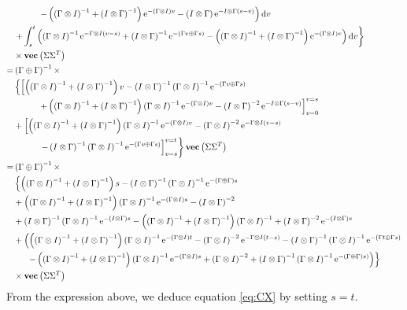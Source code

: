\documentclass[10pt,a4paper]{article}
\newcommand{\rmd}{\text{d}}
\newcommand{\e}{\text{e}}
\newcommand{\inv}{^{-1}}
\newcommand{\GoI}{\left(\Gamma \otimes I \right)}
\newcommand{\IoG}{\left(I \otimes \Gamma \right)}
\newcommand{\GpG}{\left( \Gamma \oplus \Gamma \right)}
\newcommand{\Vect}[1]{\textbf{vec}\left(#1 \right)}
\begin{document}
\begin{align*}
&\left.\hspace{1cm} - \left(\GoI\inv + \IoG\inv\right) \e^{-\GoI v} - \IoG\e^{- I \otimes \Gamma (s - v)} \right)\rmd v \\
&\left. + \int_s^t \left(  \GoI\inv \e^{- \Gamma \otimes I (v - s)} + \IoG\inv \e^{-(\Gamma v \oplus \Gamma s)} - \left(\GoI\inv + \IoG\inv\right) \e^{-\GoI v} \right) \rmd v \right\rbrace\nonumber\\
&\times  \Vect{\Sigma\Sigma^T}\nonumber\\
=& \GpG\inv \times\\
&\left\lbrace   \left[  \left(\GoI\inv + \IoG\inv\right)v  - \IoG\inv \GoI\inv \e^{-(\Gamma v \oplus \Gamma s)} \right. \right.\nonumber\\
&\left.\hspace{1cm} + \left(\GoI\inv + \IoG\inv\right)\GoI\inv \e^{-\GoI v} - \IoG^{-2}\e^{- I \otimes \Gamma (s - v)} \right]_{v=0}^{v=s}\nonumber\\
& + \left[\left(\GoI\inv + \IoG\inv\right)\GoI\inv \e^{-\GoI v} - \GoI^{-2}\e^{- \Gamma \otimes I (v - s)}\right.\nonumber \\
&\left. \left.\hspace{1cm}- \IoG\inv\GoI\inv \e^{-(\Gamma v \oplus \Gamma s)} \right]_{v=s}^{v=t}\right\rbrace \Vect{\Sigma\Sigma^T}\nonumber
\\
=& \GpG\inv \times\\
&\left\lbrace   \left(\GoI\inv + \IoG\inv\right)s - \IoG\inv \GoI\inv \e^{-\GpG s}\right.\nonumber\\
& + \left(\GoI\inv + \IoG\inv\right)\GoI\inv \e^{-\GoI s} - \IoG^{-2}  \\
& + \IoG\inv \GoI\inv \e^{-\IoG s} - \left(\GoI\inv + \IoG\inv\right)\GoI\inv + \IoG^{-2}\e^{-\IoG s}\nonumber 
\\
& + \left(\left(\GoI\inv + \IoG\inv\right)\GoI\inv \e^{-\GoI t} - \GoI^{-2}\e^{- \Gamma \otimes I (t - s)} - \IoG\inv\GoI\inv \e^{-(\Gamma t \oplus \Gamma s)}\right.\nonumber \\
&\left. \left.\hspace{0.5cm} - \left(\GoI\inv + \IoG\inv\right)\GoI\inv \e^{-\GoI s} + \GoI^{-2}  +\IoG\inv\GoI\inv \e^{-\GpG s)}  \right)\right\rbrace\nonumber\\
&\times  \Vect{\Sigma\Sigma^T}\nonumber
\end{align*}
From the expression above, we deduce equation \eqref{eq:CX} by setting $s = t$.
\end{document}
